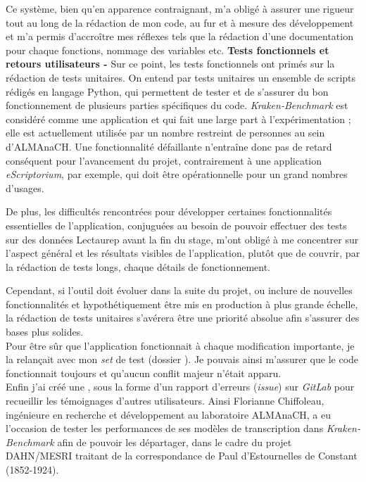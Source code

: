 Ce système, bien qu'en apparence contraignant, m'a obligé à assurer une rigueur tout au long de la rédaction de mon code, au fur et à mesure des développement et m'a permis d'accroître mes réflexes tels que la rédaction d'une documentation pour chaque fonctions, nommage des variables etc.
\newpage
\textbf{Tests fonctionnels et retours utilisateurs - } Sur ce point, les tests fonctionnels ont primés sur la rédaction de tests unitaires. On entend par tests unitaires un ensemble de scripts rédigés en langage Python, qui permettent de tester et de s'assurer du bon fonctionnement de plusieurs parties spécifiques du code.  \textit{Kraken-Benchmark} est considéré comme une application  et qui fait une large part à l'expérimentation ; elle est actuellement utilisée par un nombre restreint de personnes au sein d'ALMAnaCH. Une fonctionnalité défaillante n'entraîne donc pas de retard conséquent pour l'avancement du projet, contrairement à une application \textit{eScriptorium}, par exemple, qui doit être opérationnelle pour un grand nombres d'usages. 

De plus, les difficultés rencontrées pour développer certaines fonctionnalités essentielles de l'application, conjuguées au besoin de pouvoir effectuer des tests sur des données Lectaurep avant la fin du stage, m'ont obligé à me concentrer sur l'aspect général et les résultats visibles de l'application, plutôt que de couvrir, par la rédaction de tests longs, chaque détails de fonctionnement.

Cependant, si l'outil doit évoluer dans la suite du projet, ou inclure de nouvelles fonctionnalités et hypothétiquement être mis en production à plus grande échelle, la rédaction de tests unitaires s'avérera être une priorité absolue afin s'assurer des bases plus solides.\\

Pour être sûr que l'application fonctionnait à chaque modification importante, je la relançait avec mon \textit{set} de test (dossier ). Je pouvais ainsi m'assurer que le code fonctionnait toujours et qu'aucun conflit majeur n'était apparu.\\

Enfin j'ai créé une , sous la forme d'un rapport d'erreurs (\textit{issue}) sur \textit{GitLab} pour recueillir les témoignages d'autres utilisateurs. Ainsi Florianne Chiffoleau, ingénieure en recherche et développement au laboratoire  ALMAnaCH, a eu l'occasion de tester les performances de ses modèles de transcription dans \textit{Kraken-Benchmark} afin de pouvoir les départager, dans le cadre du projet DAHN/MESRI traitant de la correspondance de Paul d'Estournelles de Constant (1852-1924).\\

